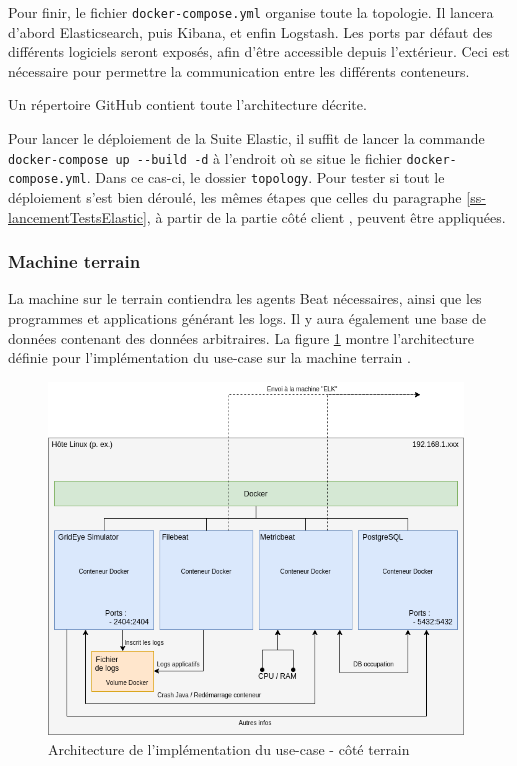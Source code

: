 \documentclass[paper=a4, fontsize=11pt]{scrartcl}
\begin{document}
Pour finir, le fichier \verb,docker-compose.yml, organise toute la topologie. Il lancera d'abord Elasticsearch, puis Kibana, et enfin Logstash. Les ports par défaut des différents logiciels seront exposés, afin d'être accessible depuis l'extérieur. Ceci est nécessaire pour permettre la communication entre les différents conteneurs.

Un répertoire GitHub \cite{jael24_jael24tb_elasticstack_2020} contient toute l'architecture décrite.

Pour lancer le déploiement de la Suite Elastic, il suffit de lancer la commande \verb,docker-compose up --build -d, à l'endroit où se situe le fichier \verb,docker-compose.yml,. Dans ce cas-ci, le dossier \verb,topology,.
Pour tester si tout le déploiement s'est bien déroulé, les mêmes étapes que celles du paragraphe \ref{ss-lancementTestsElastic}, à partir de la partie côté \og client \fg, peuvent être appliquées.

\subsubsection{Machine \og terrain \fg}
La machine sur le terrain contiendra les agents Beat nécessaires, ainsi que les programmes et applications générant les logs. Il y aura également une base de données contenant des données arbitraires. La figure \ref{f-dockerFieldTopology} montre l'architecture définie pour l'implémentation du use-case sur la machine \og terrain \fg.

\begin{figure}[H]
    \centering
    \includegraphics[width=11cm]{img/Beat_docker_topology.png}
    \caption{Architecture de l'implémentation du use-case - côté terrain}
    \label{f-dockerFieldTopology}
\end{figure}
\end{document}
